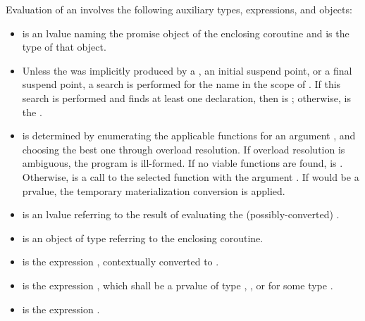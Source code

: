 \pnum
Evaluation of an  involves the following
auxiliary types, expressions, and objects:
\begin{itemize}
\item
{} is an lvalue naming the promise
object
of the enclosing coroutine and  is the type of that object.

\item Unless
the  was implicitly produced by a
, an initial suspend point,
or a final suspend point,
a search is performed for the name 
in the scope of  .
If this search is performed and finds at least one declaration,
then  is
\mbox{\tcode{)}};
otherwise,  is the  .

\item
{} is determined by enumerating the applicable
 functions for an argument
, and choosing the best one through
overload resolution. If overload resolution is ambiguous,
the program is ill-formed.
If no viable functions are found,  is .
Otherwise,  is a call to the selected function
with the argument .
If  would be a prvalue,
the temporary materialization conversion is applied.

\item
{} is an lvalue
referring to the result of evaluating
the (possibly-converted) .

\item
 is an object of type
referring to the enclosing coroutine.

\item
{} is the expression
,
contextually converted to .

\item
{} is the expression
\tcode{)},
which shall be a prvalue of type , , or
 for some type .

\item
{} is the expression
.
\end{itemize}

